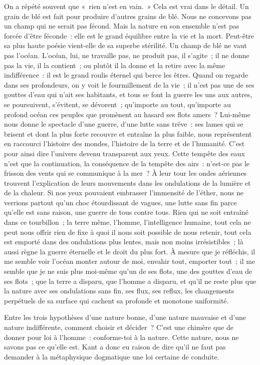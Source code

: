 \documentclass[french,twoside]{book} %
\begin{document}
On a répété souvent que « rien n’est en vain. » Cela est vrai dans le détail. Un grain de blé est fait pour produire d’autres grains de blé. Nous ne concevons pas un champ qui ne serait pas fécond. Mais la nature en son ensemble n’est pas forcée d’être féconde : elle est le grand équilibre entre la vie et la mort. Peut-être sa plus haute poésie vient-elle de sa superbe stérilité. Un champ de blé ne vaut pas l’océan. L’océan, lui, ne travaille pas, ne produit pas, il s’agite ; il ne donne pas la vie, il la contient ; ou plutôt il la donne et la retire avec la même indifférence : il est le grand roulis éternel qui berce les êtres. Quand on regarde dans ses profondeurs, on y voit le fourmillement de la vie ; il n’est pas une de ses gouttes d’eau qui n’ait ses habitants, et tous se font la guerre les uns aux autres, se poursuivent, s’évitent, se dévorent ; qu’importe au tout, qu’importe au profond océan ces peuples que promènent au hasard ses flots amers ? Lui-même nous donne le spectacle d’une guerre, d’une lutte sans trêve : ses lames qui se brisent et dont la plus forte recouvre et entraîne la plus faible, nous représentent en raccourci l’histoire des mondes, l’histoire de la terre et de l’humanité. C’est pour ainsi dire l’univers devenu transparent aux yeux. Cette tempête des eaux n’est que la continuation, la conséquence de la tempête des airs : n’est-ce pas le frisson des vents qui se communique à la mer ? À leur tour les ondes aériennes trouvent l’explication de leurs mouvements dans les ondulations de la lumière et de la chaleur. Si nos yeux pouvaient embrasser l’immensité de l’éther, nous ne verrions partout qu’un choc étourdissant de vagues, une lutte sans fin parce qu’elle est sans raison, une guerre de tous contre tous. Rien qui ne soit entraîné dans ce tourbillon ; la terre même, l’homme, l’intelligence humaine, tout cela ne peut nous offrir rien de fixe à quoi il nous soit possible de nous retenir, tout cela est emporté dans des ondulations plus lentes, mais non moins irrésistibles ; là aussi règne la guerre éternelle et le droit du plus fort. À mesure que je réfléchis, il me semble voir l’océan monter autour de moi, envahir tout, emporter tout ; il me semble que je ne suis plus moi-même qu’un de ses flots, une des gouttes d’eau de ses flots ; que la terre a disparu, que l’homme a disparu, et qu’il ne reste plus que la nature avec ses ondulations sans fin, ses flux, ses reflux, les changements perpétuels de sa surface qui cachent sa profonde et monotone uniformité.\par
Entre les trois hypothèses d’une nature bonne, d’une nature mauvaise et d’une nature indifférente, comment choisir et décider ? C’est une chimère que de donner pour loi à l’homme : conforme-toi à la nature. Cette nature, nous ne savons pas ce qu’elle est. Kant a donc eu raison de dire qu’il ne faut pas demander à la métaphysique dogmatique une loi certaine de conduite.
\end{document}
